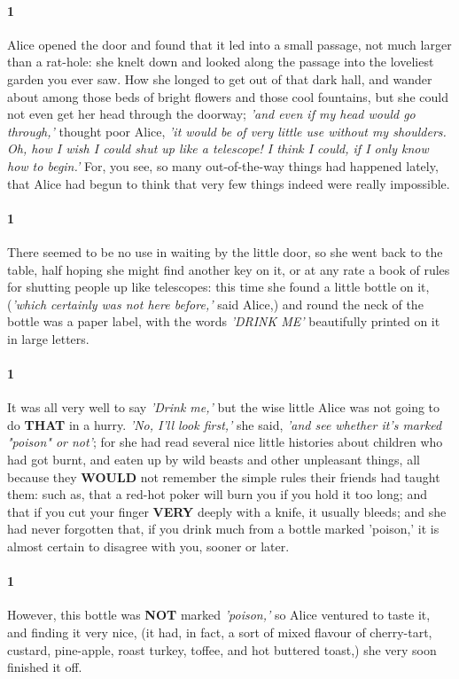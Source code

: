 \documentclass[12pt]{article}
\begin{document}
\paragraph{1} Alice opened the door and found that it led into a small passage, not
much larger than a rat-hole: she knelt down and looked along the passage
into the loveliest garden you ever saw. How she longed to get out of
that dark hall, and wander about among those beds of bright flowers and
those cool fountains, but she could not even get her head through the
doorway; \textit{'and even if my head would go through,'} thought poor Alice, \textit{'it
would be of very little use without my shoulders. Oh, how I wish I could
shut up like a telescope! I think I could, if I only know how to begin.'}
For, you see, so many out-of-the-way things had happened lately,
that Alice had begun to think that very few things indeed were really
impossible.


\paragraph{1} There seemed to be no use in waiting by the little door, so she went
back to the table, half hoping she might find another key on it, or at
any rate a book of rules for shutting people up like telescopes: this
time she found a \scriptsize{little bottle} on it, (\textit{'which certainly was not here
    before,'} said Alice,) and round the neck of the bottle was a paper
label, with the words \emph{'DRINK ME'} beautifully printed on it in large
letters.


\paragraph{1} It was all very well to say \emph{'Drink me,'} but the wise little Alice was
not going to do \textbf{THAT} in a hurry. \textit{'No, I'll look first,'} she said, \textit{'and
see whether it's marked "poison" or not'}; for she had read several nice
little histories about children who had got burnt, and eaten up by wild
beasts and other unpleasant things, all because they \textbf{WOULD} not remember
the simple rules their friends had taught them: such as, that a red-hot
poker will burn you if you hold it too long; and that if you cut your
finger \textbf{VERY} deeply with a knife, it usually bleeds; and she had never
forgotten that, if you drink much from a bottle marked 'poison,' it is
almost certain to disagree with you, sooner or later.


\paragraph{1} However, this bottle was \textbf{NOT} marked \emph{'poison,'} so Alice ventured to taste
it, and finding it very nice, (it had, in fact, a sort of mixed flavour
of cherry-tart, custard, pine-apple, roast turkey, toffee, and hot
buttered toast,) she very soon finished it off.
\end{document}

